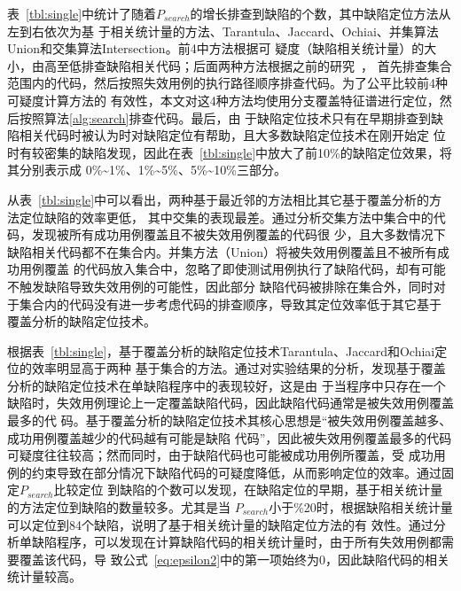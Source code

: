 表~\ref{tbl:single}中统计了随着$P_{search}$的增长排查到缺陷的个数，其中缺陷定位方法从左到右依次为基
于相关统计量的方法、Tarantula、Jaccard、Ochiai、并集算法Union和交集算法Intersection。前4中方法根据可
疑度（缺陷相关统计量）的大小，由高至低排查缺陷相关代码；后面两种方法根据之前的研究~\cite{wen2013}，
首先排查集合范围内的代码，然后按照失效用例的执行路径顺序排查代码。为了公平比较前4种可疑度计算方法的
有效性，本文对这4种方法均使用分支覆盖特征谱进行定位，然后按照算法\ref{alg:search}排查代码。最后，由
于缺陷定位技术只有在早期排查到缺陷相关代码时被认为时对缺陷定位有帮助，且大多数缺陷定位技术在刚开始定
位时有较密集的缺陷发现，因此在表~\ref{tbl:single}中放大了前10\%的缺陷定位效果，将其分别表示成
0\%\textasciitilde1\%、1\%\textasciitilde5\%、5\%\textasciitilde10\%三部分。

从表~\ref{tbl:single}中可以看出，两种基于最近邻的方法相比其它基于覆盖分析的方法定位缺陷的效率更低，
其中交集的表现最差。通过分析交集方法中集合中的代码，发现被所有成功用例覆盖且不被失效用例覆盖的代码很
少，且大多数情况下缺陷相关代码都不在集合内。并集方法（Union）将被失效用例覆盖且不被所有成功用例覆盖
的代码放入集合中，忽略了即使测试用例执行了缺陷代码，却有可能不触发缺陷导致失效用例的可能性，因此部分
缺陷代码被排除在集合外，同时对于集合内的代码没有进一步考虑代码的排查顺序，导致其定位效率低于其它基于
覆盖分析的缺陷定位技术。

根据表~\ref{tbl:single}，基于覆盖分析的缺陷定位技术Tarantula、Jaccard和Ochiai定位的效率明显高于两种
基于集合的方法。通过对实验结果的分析，发现基于覆盖分析的缺陷定位技术在单缺陷程序中的表现较好，这是由
于当程序中只存在一个缺陷时，失效用例理论上一定覆盖缺陷代码，因此缺陷代码通常是被失效用例覆盖最多的代
码。基于覆盖分析的缺陷定位技术其核心思想是``被失效用例覆盖越多、成功用例覆盖越少的代码越有可能是缺陷
代码''，因此被失效用例覆盖最多的代码可疑度往往较高；然而同时，由于缺陷代码也可能被成功用例所覆盖，受
成功用例的约束导致在部分情况下缺陷代码的可疑度降低，从而影响定位的效率。通过固定$P_{search}$比较定位
到缺陷的个数可以发现，在缺陷定位的早期，基于相关统计量的方法定位到缺陷的数量较多。尤其是当
$P_{search}$小于\%20时，根据缺陷相关统计量可以定位到84个缺陷，说明了基于相关统计量的缺陷定位方法的有
效性。通过分析单缺陷程序，可以发现在计算缺陷代码的相关统计量时，由于所有失效用例都需要覆盖该代码，导
致公式~\ref{eq:epsilon2}中的第一项始终为0，因此缺陷代码的相关统计量较高。

